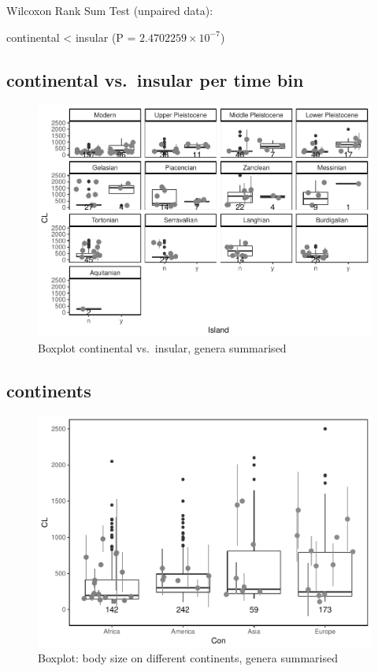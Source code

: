 \documentclass[]{article}
\begin{document}
Wilcoxon Rank Sum Test (unpaired data):

continental \textless{} insular (P = \(2.4702259\times 10^{-7}\))

\newpage

\subsection{continental vs.~insular per time
bin}\label{continental-vs.insular-per-time-bin-1}

\begin{figure}[htbp]
\centering
\includegraphics{MA_JJ_files/figure-latex/Boxplot continental vs. insular, split into time bins-1.pdf}
\caption{Boxplot continental vs.~insular, genera summarised}
\end{figure}

\newpage

\subsection{continents}\label{continents-1}

\begin{figure}[htbp]
\centering
\includegraphics{MA_JJ_files/figure-latex/Boxplot body size split into continents-1.pdf}
\caption{Boxplot: body size on different continents, genera summarised}
\end{figure}
\end{document}

